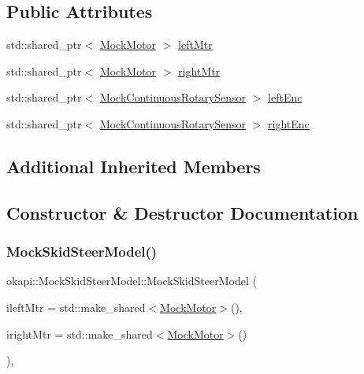 \subsection*{Public Attributes}
\begin{DoxyCompactItemize}
\item 
std\+::shared\+\_\+ptr$<$ \mbox{\hyperlink{classokapi_1_1MockMotor}{Mock\+Motor}} $>$ \mbox{\hyperlink{classokapi_1_1MockSkidSteerModel_aec44615d511a157da6df1a1694b87414}{left\+Mtr}}
\item 
std\+::shared\+\_\+ptr$<$ \mbox{\hyperlink{classokapi_1_1MockMotor}{Mock\+Motor}} $>$ \mbox{\hyperlink{classokapi_1_1MockSkidSteerModel_a7bc423f4c01b34d6011472024bac720a}{right\+Mtr}}
\item 
std\+::shared\+\_\+ptr$<$ \mbox{\hyperlink{classokapi_1_1MockContinuousRotarySensor}{Mock\+Continuous\+Rotary\+Sensor}} $>$ \mbox{\hyperlink{classokapi_1_1MockSkidSteerModel_a461270d10ae56be15947f25a75cc37cf}{left\+Enc}}
\item 
std\+::shared\+\_\+ptr$<$ \mbox{\hyperlink{classokapi_1_1MockContinuousRotarySensor}{Mock\+Continuous\+Rotary\+Sensor}} $>$ \mbox{\hyperlink{classokapi_1_1MockSkidSteerModel_a66cc21fb2b83aaa4a0d87329b5076382}{right\+Enc}}
\end{DoxyCompactItemize}
\subsection*{Additional Inherited Members}


\subsection{Constructor \& Destructor Documentation}
\mbox{\label{classokapi_1_1MockSkidSteerModel_a42eb4fb195a806a3876f6bf9a051ca1b}} 
\subsubsection{\texorpdfstring{MockSkidSteerModel()}{MockSkidSteerModel()}}
{\footnotesize\ttfamily okapi\+::\+Mock\+Skid\+Steer\+Model\+::\+Mock\+Skid\+Steer\+Model (\begin{DoxyParamCaption}\item[{const std\+::shared\+\_\+ptr$<$ \mbox{\hyperlink{classokapi_1_1MockMotor}{Mock\+Motor}} $>$ \&}]{ileft\+Mtr = {\ttfamily std\+:\+:make\+\_\+shared$<$\mbox{\hyperlink{classokapi_1_1MockMotor}{Mock\+Motor}}$>$()},  }\item[{const std\+::shared\+\_\+ptr$<$ \mbox{\hyperlink{classokapi_1_1MockMotor}{Mock\+Motor}} $>$ \&}]{iright\+Mtr = {\ttfamily std\+:\+:make\+\_\+shared$<$\mbox{\hyperlink{classokapi_1_1MockMotor}{Mock\+Motor}}$>$()} }\end{DoxyParamCaption})\hspace{0.3cm}{\ttfamily [inline]}, {\ttfamily [explicit]}}



